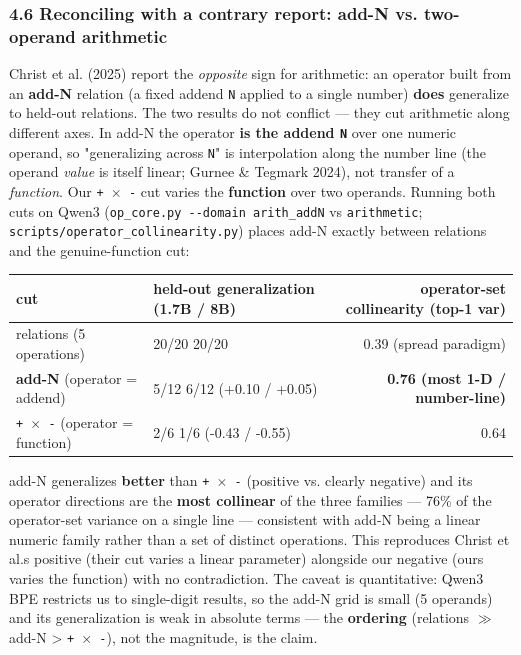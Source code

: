 \subsubsection{4.6 Reconciling with a contrary report: add-N vs.
two-operand
arithmetic}\label{46-reconciling-with-a-contrary-report-add-n-vs-two-operand-arithmetic}

Christ et al. (2025) report the \emph{opposite} sign for arithmetic: an
operator built from an \textbf{add-N} relation (a fixed addend
\texttt{N} applied to a single number) \textbf{does} generalize to
held-out relations. The two results do not conflict --- they cut
arithmetic along different axes. In add-N the operator \textbf{is the
addend \texttt{N}} over one numeric operand, so "generalizing across
\texttt{N}" is interpolation along the number line (the operand
\emph{value} is itself linear; Gurnee \& Tegmark 2024), not transfer of
a \emph{function}. Our \texttt{+\ \ensuremath{\times}\ -} cut varies the \textbf{function}
over two operands. Running both cuts on Qwen3
(\texttt{op\_core.py\ -\/-domain\ arith\_addN} vs \texttt{arithmetic};
\texttt{scripts/operator\_collinearity.py}) places add-N exactly between
relations and the genuine-function cut:

{
\begin{longtable}[]{@{}llr@{}}
\toprule\noalign{}
cut & held-out generalization (1.7B / 8B) & operator-set collinearity
(top-1 var) \\
\midrule\noalign{}
\endhead
\bottomrule\noalign{}
\endlastfoot
relations (5 operations) & 20/20 \textperiodcentered{} 20/20 & 0.39 (spread paradigm) \\
\textbf{add-N} (operator = addend) & 5/12 \textperiodcentered{} 6/12 (+0.10 / +0.05) &
\textbf{0.76 (most 1-D / number-line)} \\
\texttt{+\ \ensuremath{\times}\ -} (operator = function) & 2/6 \textperiodcentered{} 1/6 (-0.43 / -0.55) &
0.64 \\
\end{longtable}
}

add-N generalizes \textbf{better} than \texttt{+\ \ensuremath{\times}\ -} (positive vs.
clearly negative) and its operator directions are the \textbf{most
collinear} of the three families --- 76\% of the operator-set variance
on a single line --- consistent with add-N being a linear numeric family
rather than a set of distinct operations. This reproduces Christ et
al.\textquotesingle s positive (their cut varies a linear parameter)
alongside our negative (ours varies the function) with no contradiction.
The caveat is quantitative: Qwen3 BPE restricts us to single-digit
results, so the add-N grid is small (5 operands) and its generalization
is weak in absolute terms --- the \textbf{ordering} (relations \ensuremath{\gg} add-N
\textgreater{} \texttt{+\ \ensuremath{\times}\ -}), not the magnitude, is the claim.

